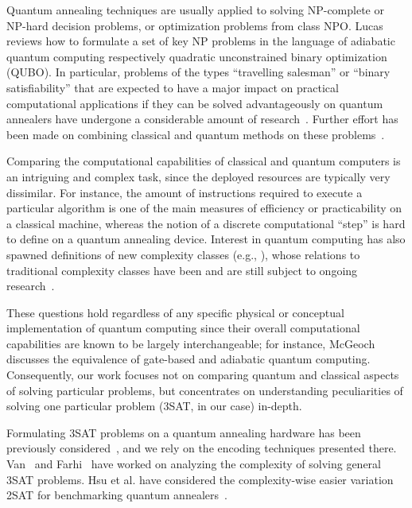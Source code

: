 Quantum annealing techniques are usually applied to solving NP-complete or NP-hard decision problems, or optimization problems from class NPO. Lucas~\cite{lucas2014ising} reviews how to formulate a set of key NP problems in the language of adiabatic quantum computing respectively quadratic unconstrained binary optimization (QUBO). In particular, problems of the types ``travelling salesman'' or ``binary satisfiability'' that are expected to have a major impact on practical computational applications if they can be solved advantageously on quantum annealers have undergone a considerable amount of research~\cite{heim2017designing,warren2017small,moylett2017quantum,strand2017zzz,benjamin2017measurement,neukart2017traffic}. Further effort has been made on combining classical and quantum methods on these problems~\cite{feld2018hybrid}.

Comparing the computational capabilities of classical and quantum computers is an intriguing and complex task, since the deployed resources are typically very dissimilar. For instance, the amount of instructions required to execute a particular algorithm is one of the main measures of efficiency or practicability on a classical machine, whereas the notion of a discrete computational ``step'' is hard to define on a quantum annealing device. Interest in quantum computing has also spawned definitions of new complexity classes (e.g., \cite{klauck2017complexity,morimae2017merlinization}), whose relations to traditional complexity classes have been and are still subject to ongoing research~\cite{bernstein1997quantum,marriott2005quantum}.


These questions hold regardless of any specific physical or conceptual implementation of quantum computing since their overall computational capabilities are known to be largely interchangeable; for instance, McGeoch~\cite{mcgeoch2014adiabatic} discusses the
equivalence of gate-based and adiabatic quantum computing. Consequently,
our work focuses not on comparing quantum and classical aspects of solving particular problems, but concentrates on understanding peculiarities
of solving one particular problem (3SAT, in our case) in-depth.

Formulating 3SAT problems on a quantum annealing hardware has been previously considered~\cite{choi2011different,choi2010adiabatic,farhi2000quantum}, and we rely on the encoding techniques presented there. Van~\cite{van2001powerful} and Farhi~\cite{farhi2009quantum} have worked on analyzing the complexity of solving general 3SAT problems. Hsu et al. have considered the complexity-wise easier variation 2SAT for benchmarking quantum annealers~\cite{hsu2018quantum}.
 
